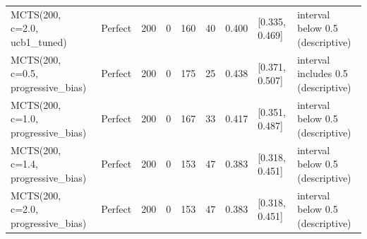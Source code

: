 \begin{table}[!t]
\begin{tabular}{llrrrrrll}
MCTS(200, c=2.0, ucb1\_tuned) & Perfect & 200 & 0 & 160 & 40 & 0.400 & [0.335, 0.469] & interval below 0.5 (descriptive) \\
MCTS(200, c=0.5, progressive\_bias) & Perfect & 200 & 0 & 175 & 25 & 0.438 & [0.371, 0.507] & interval includes 0.5 (descriptive) \\
MCTS(200, c=1.0, progressive\_bias) & Perfect & 200 & 0 & 167 & 33 & 0.417 & [0.351, 0.487] & interval below 0.5 (descriptive) \\
MCTS(200, c=1.4, progressive\_bias) & Perfect & 200 & 0 & 153 & 47 & 0.383 & [0.318, 0.451] & interval below 0.5 (descriptive) \\
MCTS(200, c=2.0, progressive\_bias) & Perfect & 200 & 0 & 153 & 47 & 0.383 & [0.318, 0.451] & interval below 0.5 (descriptive) \\
\bottomrule
\end{tabular}
\end{table}
